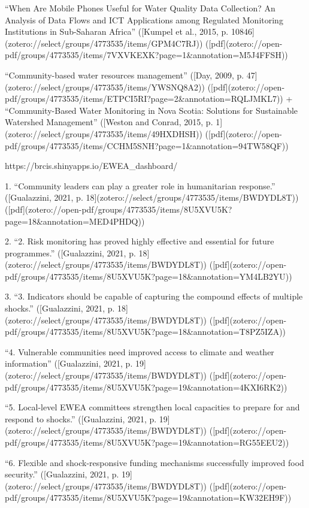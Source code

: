 “When Are Mobile Phones Useful for Water Quality Data Collection? An Analysis of Data Flows and ICT Applications among Regulated Monitoring Institutions in Sub-Saharan Africa” ([Kumpel et al., 2015, p. 10846](zotero://select/groups/4773535/items/GPM4C7RJ)) ([pdf](zotero://open-pdf/groups/4773535/items/7VXVKEXK?page=1&annotation=M5J4FFSH))


“Community-based water resources management” ([Day, 2009, p. 47](zotero://select/groups/4773535/items/YWSNQ8A2)) ([pdf](zotero://open-pdf/groups/4773535/items/ETPCI5RI?page=2&annotation=RQLJMKL7))
+
“Community-Based Water Monitoring in Nova Scotia: Solutions for Sustainable Watershed Management” ([Weston and Conrad, 2015, p. 1](zotero://select/groups/4773535/items/49HXDHSH)) ([pdf](zotero://open-pdf/groups/4773535/items/CCHM5SNH?page=1&annotation=94TW58QF))


https://brcis.shinyapps.io/EWEA_dashboard/

1. “Community leaders can play a greater role in humanitarian response.” ([Gualazzini, 2021, p. 18](zotero://select/groups/4773535/items/BWDYDL8T)) ([pdf](zotero://open-pdf/groups/4773535/items/8U5XVU5K?page=18&annotation=MED4PHDQ))

2. “2. Risk monitoring has proved highly effective and essential for future programmes.” ([Gualazzini, 2021, p. 18](zotero://select/groups/4773535/items/BWDYDL8T)) ([pdf](zotero://open-pdf/groups/4773535/items/8U5XVU5K?page=18&annotation=YM4LB2YU))


3. “3. Indicators should be capable of capturing the compound effects of multiple shocks.” ([Gualazzini, 2021, p. 18](zotero://select/groups/4773535/items/BWDYDL8T)) ([pdf](zotero://open-pdf/groups/4773535/items/8U5XVU5K?page=18&annotation=T8PZ5IZA))

“4. Vulnerable communities need improved access to climate and weather information” ([Gualazzini, 2021, p. 19](zotero://select/groups/4773535/items/BWDYDL8T)) ([pdf](zotero://open-pdf/groups/4773535/items/8U5XVU5K?page=19&annotation=4KXI6RK2))

“5. Local-level EWEA committees strengthen local capacities to prepare for and respond to shocks.” ([Gualazzini, 2021, p. 19](zotero://select/groups/4773535/items/BWDYDL8T)) ([pdf](zotero://open-pdf/groups/4773535/items/8U5XVU5K?page=19&annotation=RG55EEU2))

“6. Flexible and shock-responsive funding mechanisms successfully improved food security.” ([Gualazzini, 2021, p. 19](zotero://select/groups/4773535/items/BWDYDL8T)) ([pdf](zotero://open-pdf/groups/4773535/items/8U5XVU5K?page=19&annotation=KW32EH9F))


